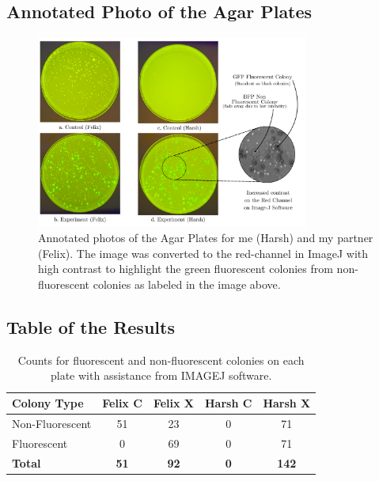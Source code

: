\documentclass[12pt,a4paper]{article}
\begin{document}
\subsection{Annotated Photo of the Agar Plates}
\begin{figure}[h]
    \centering
    \includegraphics[width=0.8\textwidth]{figures/exp_1_agar_plates.png}
    \caption{Annotated photos of the Agar Plates for me (Harsh) and my partner (Felix). The image was converted to the red-channel in ImageJ with high contrast to highlight the green fluorescent colonies from non-fluorescent colonies as labeled in the image above.}\label{fig:exp_1_agar_plates}
\end{figure}

\subsection{Table of the Results}
\begin{table}[h]
    \centering
    \begin{tabular}{|l|c|c|c|c|}
        \hline
        \textbf{Colony Type} & \textbf{Felix C} & \textbf{Felix X} & \textbf{Harsh C} & \textbf{Harsh X} \\
        \hline
        Non-Fluorescent      & 51               & 23               & 0                & 71               \\
        \hline
        Fluorescent          & 0                & 69               & 0                & 71               \\
        \hline
        \textbf{Total}       & \textbf{51}      & \textbf{92}      & \textbf{0}       & \textbf{142}     \\
        \hline
    \end{tabular}
    \caption{\centering Counts for fluorescent and non-fluorescent colonies on each plate with assistance from IMAGEJ software.}\label{tab:colony_counts}
\end{table}
\end{document}
